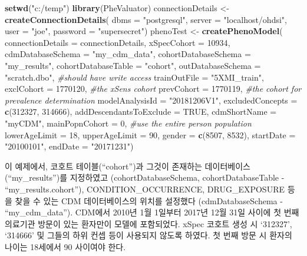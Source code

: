 \documentclass[10.5pt]{book}
\newenvironment{Shaded}{\begin{snugshade}}{\end{snugshade}}
\newcommand{\KeywordTok}[1]{\textcolor[rgb]{0.13,0.29,0.53}{\textbf{#1}}}
\newcommand{\DataTypeTok}[1]{\textcolor[rgb]{0.13,0.29,0.53}{#1}}
\newcommand{\DecValTok}[1]{\textcolor[rgb]{0.00,0.00,0.81}{#1}}
\newcommand{\StringTok}[1]{\textcolor[rgb]{0.31,0.60,0.02}{#1}}
\newcommand{\CommentTok}[1]{\textcolor[rgb]{0.56,0.35,0.01}{\textit{#1}}}
\newcommand{\OtherTok}[1]{\textcolor[rgb]{0.56,0.35,0.01}{#1}}
\newcommand{\NormalTok}[1]{#1}
\theoremstyle{definition}
\theoremstyle{definition}
\theoremstyle{definition}
\theoremstyle{remark}
\begin{document}
\begin{Shaded}
\begin{Highlighting}[]
\KeywordTok{setwd}\NormalTok{(}\StringTok{"c:/temp"}\NormalTok{)}
\KeywordTok{library}\NormalTok{(PheValuator)}
\NormalTok{connectionDetails <-}\StringTok{ }\KeywordTok{createConnectionDetails}\NormalTok{(}
  \DataTypeTok{dbms =} \StringTok{"postgresql"}\NormalTok{,}
  \DataTypeTok{server =} \StringTok{"localhost/ohdsi"}\NormalTok{,}
  \DataTypeTok{user =} \StringTok{"joe"}\NormalTok{,}
  \DataTypeTok{password =} \StringTok{"supersecret"}\NormalTok{)}
\NormalTok{phenoTest <-}\StringTok{ }\KeywordTok{createPhenoModel}\NormalTok{(}
  \DataTypeTok{connectionDetails =}\NormalTok{ connectionDetails,}
  \DataTypeTok{xSpecCohort =} \DecValTok{10934}\NormalTok{,}
  \DataTypeTok{cdmDatabaseSchema =} \StringTok{"my_cdm_data"}\NormalTok{,}
  \DataTypeTok{cohortDatabaseSchema =} \StringTok{"my_results"}\NormalTok{,}
  \DataTypeTok{cohortDatabaseTable =} \StringTok{"cohort"}\NormalTok{,}
  \DataTypeTok{outDatabaseSchema =} \StringTok{"scratch.dbo"}\NormalTok{, }\CommentTok{#should have write access}
  \DataTypeTok{trainOutFile =} \StringTok{"5XMI_train"}\NormalTok{,}
  \DataTypeTok{exclCohort =} \DecValTok{1770120}\NormalTok{, }\CommentTok{#the xSens cohort}
  \DataTypeTok{prevCohort =} \DecValTok{1770119}\NormalTok{, }\CommentTok{#the cohort for prevalence determination}
  \DataTypeTok{modelAnalysisId =} \StringTok{"20181206V1"}\NormalTok{,}
  \DataTypeTok{excludedConcepts =} \KeywordTok{c}\NormalTok{(}\DecValTok{312327}\NormalTok{, }\DecValTok{314666}\NormalTok{),}
  \DataTypeTok{addDescendantsToExclude =} \OtherTok{TRUE}\NormalTok{,}
  \DataTypeTok{cdmShortName =} \StringTok{"myCDM"}\NormalTok{,}
  \DataTypeTok{mainPopnCohort =} \DecValTok{0}\NormalTok{, }\CommentTok{#use the entire person population}
  \DataTypeTok{lowerAgeLimit =} \DecValTok{18}\NormalTok{,}
  \DataTypeTok{upperAgeLimit =} \DecValTok{90}\NormalTok{,}
  \DataTypeTok{gender =} \KeywordTok{c}\NormalTok{(}\DecValTok{8507}\NormalTok{, }\DecValTok{8532}\NormalTok{),}
  \DataTypeTok{startDate =} \StringTok{"20100101"}\NormalTok{,}
  \DataTypeTok{endDate =} \StringTok{"20171231"}\NormalTok{)}
\end{Highlighting}
\end{Shaded}

이 예제에서, 코호트 테이블(``cohort'')과 그것이 존재하는
데이터베이스(``my\_results'')를 지정하였고 (cohortDatabaseSchema,
cohortDatabaseTable - ``my\_results.cohort''), CONDITION\_OCCURRENCE,
DRUG\_EXPOSURE 등을 찾을 수 있는 CDM 데이터베이스의 위치를 설정했다
(cdmDatabaseSchema - ``my\_cdm\_data''). CDM에서 2010년 1월 1일부터
2017년 12월 31일 사이에 첫 번째 의료기관 방문이 있는 환자만이 모델에
포함되었다. xSpec 코호트 생성 시 `312327', `314666' 및 그들의 하위 컨셉
등이 사용되지 않도록 하였다. 첫 번째 방문 시 환자의 나이는 18세에서 90
사이여야 한다.
\end{document}
